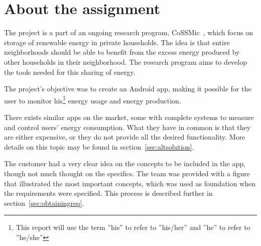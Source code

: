 \section{About the assignment}

The project is a part of an ongoing research program, CoSSMic~\cite{cossmic}, which focus on storage of renewable energy in private households. 
The idea is that entire neighborhoods should be able to benefit from the excess energy produced by other households in their neighborhood. 
The research program aims to develop the tools needed for this sharing of energy. 

The project's objective was to create an Android \gls{app}, making it possible for the user to monitor his\footnote{This report will use the term ''his'' to refer to ''his/her'' and ''he'' to refer to ''he/she''} 
energy usage and energy production. 

There exists similar apps on the market, some with complete systems to measure and control users' energy consumption. 
What they have in common is that they are either expensive, or they do not provide all the desired functionality. More details on this topic may be found in section~\ref{sec:altsolution}.

The customer had a very clear idea on the concepts to be included in the app, though not much thought on the specifics. The team was provided with a figure that illustrated the most important concepts, which was used as foundation when the requirements were specified. 
This process is described further in section~\ref{sec:obtainingreq}.